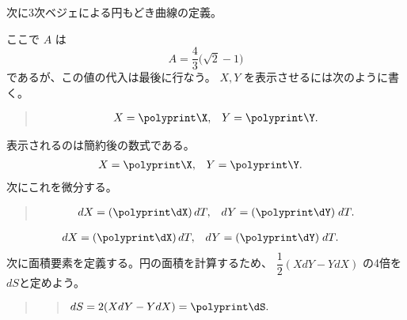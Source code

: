 \documentclass{jsarticle}
\begin{document}
\begin{quote}
\begin{boxedverbatim}
\end{boxedverbatim}
\end{quote}
次に3次ベジェによる円もどき曲線の定義。
\polydefine{}
\polydefine{}
\begin{quote}
\begin{boxedverbatim}
\polydefine{}
\polydefine{}
\end{boxedverbatim}
\end{quote}
ここで $A$ は
\[
  A=\dfrac43\bigl(\sqrt2-1\bigr)
\]
であるが、この値の代入は最後に行なう。
$X,Y$ を表示させるには次のように書く。
\begin{quote}
\begin{boxedverbatim}
\begin{align*}
  X &= \polyprint\X, & Y &= \polyprint\Y.
\end{align*}    
\end{boxedverbatim}
\end{quote}
表示されるのは簡約後の数式である。
\begin{align*}
  X &= \polyprint\X, & Y &= \polyprint\Y.
\end{align*}
\newpage
次にこれを微分する。
\polydiff{}\X  \polydiff{}\Y
\begin{quote}
\begin{boxedverbatim}
\polydiff{}\X  \polydiff{}\Y
\begin{align*}
  dX &= (\polyprint\dX)\,dT, & dY &= (\polyprint\dY)\;dT.
\end{align*}    
\end{boxedverbatim}
\end{quote}
\begin{align*}
  dX &= (\polyprint\dX)\,dT, & dY &= (\polyprint\dY)\;dT.
\end{align*}    
次に面積要素を定義する。円の面積を計算するため、
$\dfrac12(XdY-YdX)$ の4倍を$dS$と定めよう。
\begin{quote}
\begin{boxedverbatim}
\polymul\dSA\X\dY  \polymul\dSB\Y\dX
\polysub\dS\dSA\dSB \polymul{}\dS
\begin{quote}
$dS=2(XdY-YdX)=\polyprint\dS.$
\end{quote}
\end{boxedverbatim}
\end{quote}
\end{document}
